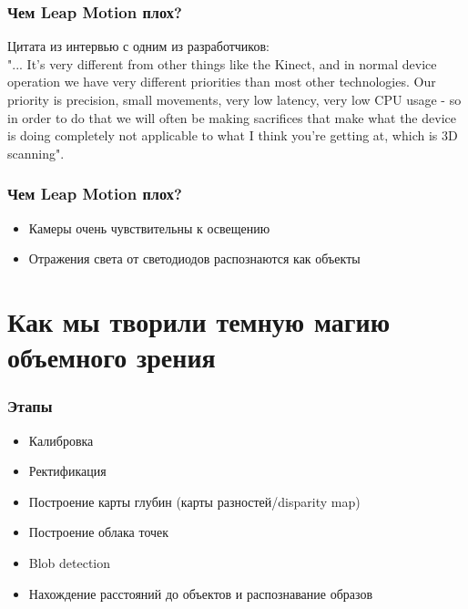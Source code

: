 \documentclass{beamer}
\begin{document}
		\begin{frame}
			\frametitle{Чем Leap Motion плох?}
			
			Цитата из интервью с одним из разработчиков:\\
			"... It’s very different from other things like the Kinect, and in
			normal device
			operation we have very different priorities than most other technologies.
			Our priority is precision, small movements, very low latency, very low CPU
			usage - so in order to do that we will often be making sacrifices that make
			what the device is doing completely not applicable to what I think you’re
			getting at, which is 3D scanning".
		\end{frame}
		
		\begin{frame}
			\frametitle{Чем Leap Motion плох?}
			
			\begin{itemize}
				\item Камеры очень чувствительны к освещению
				\item Отражения света от светодиодов распознаются как объекты
			\end{itemize}
		\end{frame}
		
	\section{Как мы творили темную магию объемного зрения}
		\begin{frame}
			\frametitle{Этапы}
			
			\begin{itemize}
				\item Калибровка
				\item Ректификация
				\item Построение карты глубин (карты разностей/disparity map)
				\item Построение облака точек
				\item Blob detection
				\item Нахождение расстояний до объектов и распознавание образов
			\end{itemize}
		\end{frame}
		
\end{document}

